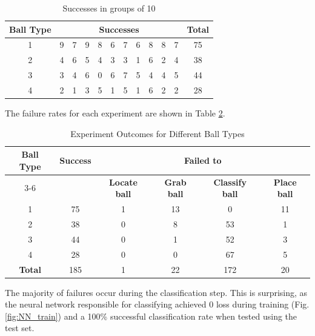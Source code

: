 \begin{table}[ht]
\centering
\setlength{\tabcolsep}{6pt}
\setlength{\abovecaptionskip}{6pt}
\begin{tabular}{|c|c|c|c|c|c|c|c|c|c|c|c|}
\hline
{\textbf{Ball Type}} & \multicolumn{10}{|c|}{\textbf{Successes}} & {\textbf{Total}}\\
\hline
1 & 9 & 7 & 9 & 8 & 6 & 7 & 6 & 8 & 8 & 7 & \cellcolor[HTML]{EFEFEF}75\\ \hline
2 & 4 & 6 & 5 & 4 & 3 & 3 & 1 & 6 & 2 & 4 & \cellcolor[HTML]{EFEFEF}38\\ \hline
3 & 3 & 4 & 6 & 0 & 6 & 7 & 5 & 4 & 4 & 5 & \cellcolor[HTML]{EFEFEF}44 \\ \hline
4 & 2 & 1 & 3 & 5 & 1 & 5 & 1 & 6 & 2 & 2 & \cellcolor[HTML]{EFEFEF}28\\ \hline
\end{tabular}
\caption{Successes in groups of 10}
\label{tab:successes_grouped}
\end{table}

\noindent
The failure rates for each experiment are shown in Table \ref{tab:experiment}.

\begin{table}[ht]
\centering
\setlength{\tabcolsep}{6pt}
\setlength{\abovecaptionskip}{6pt}
\begin{tabular}{|c|c|c|c|c|c|}
\hline
\multirow{2}{*}{\textbf{Ball Type}} & \multirow{2}{*}{\textbf{Success}} &\multicolumn{4}{|c|}{\textbf{Failed to}} \\ \cline{3-6}
&  & \textbf{Locate ball} & \textbf{Grab ball} & \textbf{Classify ball} &\textbf{Place ball} \\ \hline
1 & 75 & 1 & 13 & 0 & 11 \\ \hline
2 & 38 & 0 & 8 & 53 & 1 \\ \hline
3 & 44 & 0 & 1 & 52 & 3 \\ \hline
4 & 28 & 0 & 0 & 67 & 5 \\ \hline
\rowcolor[HTML]{EFEFEF} \textbf{Total} & 185 & 1 & 22 & 172 & 20 \\ \hline
\end{tabular}
\caption{Experiment Outcomes for Different Ball Types}
\label{tab:experiment}
\end{table}

\noindent
The majority of failures occur during the classification step. This is surprising, as the neural network responsible for classifying achieved 0 loss during training (Fig. \ref{fig:NN_train}) and a 100\% successful classification rate when tested using the test set.

